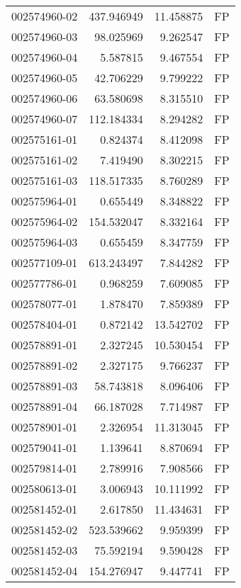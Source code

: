 \begin{tabular}{lrrl}
002574960-02 &  437.946949 &      11.458875 &   FP \\
002574960-03 &   98.025969 &       9.262547 &   FP \\
002574960-04 &    5.587815 &       9.467554 &   FP \\
002574960-05 &   42.706229 &       9.799222 &   FP \\
002574960-06 &   63.580698 &       8.315510 &   FP \\
002574960-07 &  112.184334 &       8.294282 &   FP \\
002575161-01 &    0.824374 &       8.412098 &   FP \\
002575161-02 &    7.419490 &       8.302215 &   FP \\
002575161-03 &  118.517335 &       8.760289 &   FP \\
002575964-01 &    0.655449 &       8.348822 &   FP \\
002575964-02 &  154.532047 &       8.332164 &   FP \\
002575964-03 &    0.655459 &       8.347759 &   FP \\
002577109-01 &  613.243497 &       7.844282 &   FP \\
002577786-01 &    0.968259 &       7.609085 &   FP \\
002578077-01 &    1.878470 &       7.859389 &   FP \\
002578404-01 &    0.872142 &      13.542702 &   FP \\
002578891-01 &    2.327245 &      10.530454 &   FP \\
002578891-02 &    2.327175 &       9.766237 &   FP \\
002578891-03 &   58.743818 &       8.096406 &   FP \\
002578891-04 &   66.187028 &       7.714987 &   FP \\
002578901-01 &    2.326954 &      11.313045 &   FP \\
002579041-01 &    1.139641 &       8.870694 &   FP \\
002579814-01 &    2.789916 &       7.908566 &   FP \\
002580613-01 &    3.006943 &      10.111992 &   FP \\
002581452-01 &    2.617850 &      11.434631 &   FP \\
002581452-02 &  523.539662 &       9.959399 &   FP \\
002581452-03 &   75.592194 &       9.590428 &   FP \\
002581452-04 &  154.276947 &       9.447741 &   FP \\

\end{tabular}
